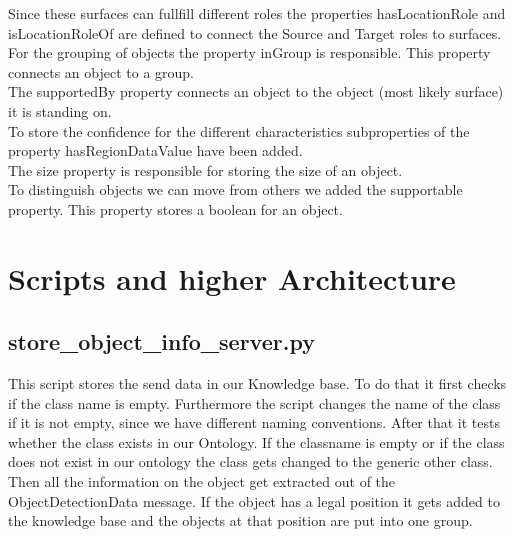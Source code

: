 \documentclass[main.tex]{subfiles}
\begin{document}
Since these surfaces can fullfill different roles the properties hasLocationRole and isLocationRoleOf are defined to connect the Source and Target roles to surfaces.\\
For the grouping of objects the property inGroup is responsible. This property connects an object to a group.\\
The supportedBy property connects an object to the object (most likely surface) it is standing on.\\
To store the confidence for the different characteristics subproperties of the property hasRegionDataValue have been added.\\
The size property is responsible for storing the size of an object.\\
To distinguish objects we can move from others we added the supportable property. This property stores a boolean for an object.



\section{Scripts and higher Architecture}
\subsection{store\_object\_info\_server.py}
This script stores the send data in our Knowledge base.
To do that it first checks if the class name is empty. Furthermore the script changes the name of the class if it is not empty, since we have different naming conventions. After that it tests whether the class exists in our Ontology. If the classname is empty or if the class does not exist in our ontology the class gets changed to the generic other class. Then all the information on the object get extracted out of the ObjectDetectionData message. If the object has a legal position it gets added to the knowledge base and the objects at that position are put into one group.

	\endgroup
\end{document}
